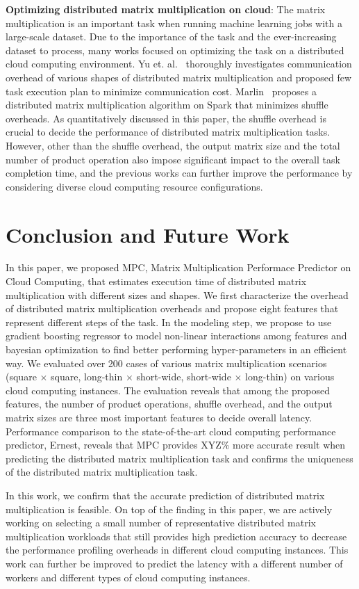 \documentclass[10pt, conference, compsocconf]{IEEEtran}
\begin{document}
\textbf{Optimizing distributed matrix multiplication on cloud}: The matrix multiplication is an important task when running machine learning jobs with a large-scale dataset. Due to the importance of the task and the ever-increasing dataset to process, many works focused on optimizing the task on a distributed cloud computing environment. Yu et. al.~\cite{matmult-overhead-profiling} thoroughly investigates communication overhead of various shapes of distributed matrix multiplication and proposed few task execution plan to minimize communication cost. Marlin~\cite{marlin} proposes a distributed matrix multiplication algorithm on Spark that minimizes shuffle overheads. As quantitatively discussed in this paper, the shuffle overhead is crucial to decide the performance of distributed matrix multiplication tasks. However, other than the shuffle overhead, the output matrix size and the total number of product operation also impose significant impact to the overall task completion time, and the previous works can further improve the performance by considering diverse cloud computing resource configurations.

\section{Conclusion and Future Work}
In this paper, we proposed MPC, Matrix Multiplication Performace Predictor on Cloud Computing, that estimates execution time of distributed matrix multiplication with different sizes and shapes. We first characterize the overhead of distributed matrix multiplication overheads and propose eight features that represent different steps of the task. In the modeling step, we propose to use gradient boosting regressor to model non-linear interactions among features and bayesian optimization to find better performing hyper-parameters in an efficient way. We evaluated over 200 cases of various matrix multiplication scenarios (square $\times$ square, long-thin $\times$ short-wide, short-wide $\times$ long-thin) on various cloud computing instances. The evaluation reveals that among the proposed features, the number of product operations, shuffle overhead, and the output matrix sizes are three most important features to decide overall latency. Performance comparison to the state-of-the-art cloud computing performance predictor, Ernest, reveals that MPC provides XYZ\% more accurate result when predicting the distributed matrix multiplication task and confirms the uniqueness of the distributed matrix multiplication task.

In this work, we confirm that the accurate prediction of distributed matrix multiplication is feasible. On top of the finding in this paper, we are actively working on selecting a small number of representative distributed matrix multiplication workloads that still provides high prediction accuracy to decrease the performance profiling overheads in different cloud computing instances. This work can further be improved to predict the latency with a different number of workers and different types of cloud computing instances.


\end{document}
